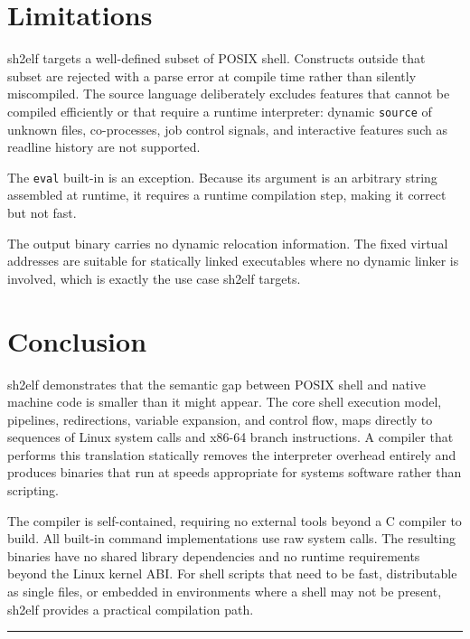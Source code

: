 \documentclass[10pt,twocolumn]{article}
\begin{document}
\section{Limitations}

sh2elf targets a well-defined subset of POSIX shell. Constructs outside
that subset are rejected with a parse error at compile time rather
than silently miscompiled. The source language deliberately excludes
features that cannot be compiled efficiently or that require a runtime
interpreter: dynamic \texttt{source} of unknown files, co-processes,
job control signals, and interactive features such as readline history
are not supported.

The \texttt{eval} built-in is an exception. Because its argument is an
arbitrary string assembled at runtime, it requires a runtime
compilation step, making it correct but not fast.

The output binary carries no dynamic relocation information. The fixed
virtual addresses are suitable for statically linked executables where
no dynamic linker is involved, which is exactly the use case sh2elf
targets.


\section{Conclusion}

sh2elf demonstrates that the semantic gap between POSIX shell and
native machine code is smaller than it might appear. The core shell
execution model, pipelines, redirections, variable expansion, and
control flow, maps directly to sequences of Linux system calls and
x86-64 branch instructions. A compiler that performs this translation
statically removes the interpreter overhead entirely and produces
binaries that run at speeds appropriate for systems software rather
than scripting.

The compiler is self-contained, requiring no external tools beyond a C
compiler to build. All built-in command implementations use raw system
calls. The resulting binaries have no shared library dependencies and
no runtime requirements beyond the Linux kernel ABI. For shell scripts
that need to be fast, distributable as single files, or embedded in
environments where a shell may not be present, sh2elf provides a
practical compilation path.

\bigskip
\noindent\rule{\columnwidth}{0.4pt}
\smallskip

\end{document}
